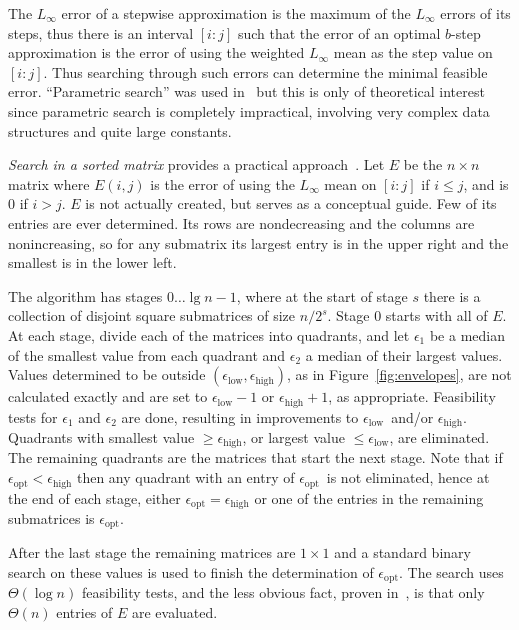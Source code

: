 \documentclass[11pt]{article}
\newcommand{\inter}[2]{\ensuremath{[#1\!:\!#2]}}
\newcommand{\epslow}{\ensuremath{\epsilon_\mathrm{low}}}
\newcommand{\epshigh}{\ensuremath{\epsilon_\mathrm{high}}}
\newcommand{\epsopt}{\ensuremath{\epsilon_\mathrm{opt}}}
\newcommand{\epsinterval}[1]{\ensuremath{(\epslow,\epshigh#1}}
\begin{document}
The $L_\infty$ error of a stepwise approximation is the maximum of the $L_\infty$ errors of its steps,
thus there is an interval $\inter{i}{j}$ such that the error of an optimal $b$-step approximation is the error of using the weighted $L_\infty$ mean as the step value on $\inter{i}{j}$.
Thus searching through such errors can determine the minimal feasible error.
``Parametric search'' was used in~\cite{FournierVigneronLinftyParametric,JQReducedIso_IF2012} but this is only of theoretical interest since parametric search is completely impractical, involving very complex data structures and quite large constants.

\textit{Search in a sorted matrix} provides a practical approach~\cite{FredericksonJohnsonSortedMatrix}.
Let $E$ be the $n \times n$ matrix where $E(i,j)$ is the error of using the $L_\infty$ mean on \inter{i}{j} if $i \leq j$, and is 0 if $i > j$.
$E$ is not actually created, but serves as a conceptual guide.
Few of its entries are ever determined.
Its rows are nondecreasing and the columns are nonincreasing, so
for any submatrix its largest entry is in the upper right and the smallest is in the lower left.

The algorithm has stages $0 \ldots \lg n -\!1$, where at the start of stage $s$ there is a collection of disjoint square submatrices of size $n/2^s$.
Stage 0 starts with all of $E$.
At each stage, divide each of the matrices into quadrants, and let $\epsilon_1$ be a median of the smallest value from each quadrant and $\epsilon_2$ a median of their largest values.
Values determined to be outside \epsinterval{)}, as in Figure~\ref{fig:envelopes}, are not calculated exactly and are set to $\epslow-1$ or $\epshigh+1$, as appropriate.
Feasibility tests for $\epsilon_1$ and $\epsilon_2$ are done, resulting in improvements to \epslow\ and/or \epshigh.
Quadrants with smallest value $\geq \epshigh$, or largest value $\leq 
\epslow$, are eliminated.
The remaining quadrants are the matrices that start the next stage.
Note that if $\epsopt < \epshigh$ then any quadrant with an entry of \epsopt\ is not eliminated,
hence at the end of each stage, either $\epsopt = \epshigh$ or one of the entries in the remaining submatrices is \epsopt.

After the last stage the remaining matrices are $1 \times 1$ and a standard binary search on these values is used to finish the determination of \epsopt.
The search uses $\Theta(\log n)$ feasibility tests, and the less obvious fact, proven in~\cite{FredericksonJohnsonSortedMatrix}, is that only $\Theta(n)$ entries of $E$ are evaluated.
\end{document}

